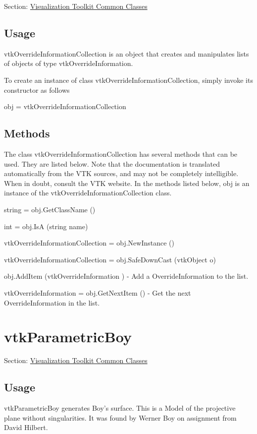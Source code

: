 Section\-: \hyperlink{sec_vtkcommon}{Visualization Toolkit Common Classes} \hypertarget{vtkwidgets_vtkxyplotwidget_Usage}{}\subsection{Usage}\label{vtkwidgets_vtkxyplotwidget_Usage}
vtk\-Override\-Information\-Collection is an object that creates and manipulates lists of objects of type vtk\-Override\-Information.

To create an instance of class vtk\-Override\-Information\-Collection, simply invoke its constructor as follows \begin{DoxyVerb}  obj = vtkOverrideInformationCollection
\end{DoxyVerb}
 \hypertarget{vtkwidgets_vtkxyplotwidget_Methods}{}\subsection{Methods}\label{vtkwidgets_vtkxyplotwidget_Methods}
The class vtk\-Override\-Information\-Collection has several methods that can be used. They are listed below. Note that the documentation is translated automatically from the V\-T\-K sources, and may not be completely intelligible. When in doubt, consult the V\-T\-K website. In the methods listed below, {\ttfamily obj} is an instance of the vtk\-Override\-Information\-Collection class. 
\begin{DoxyItemize}
\item {\ttfamily string = obj.\-Get\-Class\-Name ()}  
\item {\ttfamily int = obj.\-Is\-A (string name)}  
\item {\ttfamily vtk\-Override\-Information\-Collection = obj.\-New\-Instance ()}  
\item {\ttfamily vtk\-Override\-Information\-Collection = obj.\-Safe\-Down\-Cast (vtk\-Object o)}  
\item {\ttfamily obj.\-Add\-Item (vtk\-Override\-Information )} -\/ Add a Override\-Information to the list.  
\item {\ttfamily vtk\-Override\-Information = obj.\-Get\-Next\-Item ()} -\/ Get the next Override\-Information in the list.  
\end{DoxyItemize}\hypertarget{vtkcommon_vtkparametricboy}{}\section{vtk\-Parametric\-Boy}\label{vtkcommon_vtkparametricboy}
Section\-: \hyperlink{sec_vtkcommon}{Visualization Toolkit Common Classes} \hypertarget{vtkwidgets_vtkxyplotwidget_Usage}{}\subsection{Usage}\label{vtkwidgets_vtkxyplotwidget_Usage}
vtk\-Parametric\-Boy generates Boy's surface. This is a Model of the projective plane without singularities. It was found by Werner Boy on assignment from David Hilbert.

